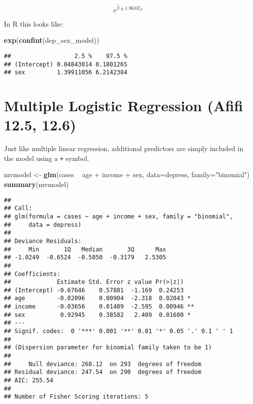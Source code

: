 \documentclass[]{article}
\newenvironment{Shaded}{\begin{snugshade}}{\end{snugshade}}
\newcommand{\KeywordTok}[1]{\textcolor[rgb]{0.13,0.29,0.53}{\textbf{{#1}}}}
\newcommand{\DataTypeTok}[1]{\textcolor[rgb]{0.13,0.29,0.53}{{#1}}}
\newcommand{\StringTok}[1]{\textcolor[rgb]{0.31,0.60,0.02}{{#1}}}
\newcommand{\NormalTok}[1]{{#1}}
\begin{document}
\[e^{\hat{\beta} \pm 1.96 SE_{\beta}} \]

In R this looks like:

\begin{Shaded}
\begin{Highlighting}[]
\KeywordTok{exp}\NormalTok{(}\KeywordTok{confint}\NormalTok{(dep_sex_model))}
\end{Highlighting}
\end{Shaded}

\begin{verbatim}
##                  2.5 %    97.5 %
## (Intercept) 0.04843014 0.1801265
## sex         1.39911056 6.2142384
\end{verbatim}

\section{Multiple Logistic Regression (Afifi 12.5,
12.6)}\label{multiple-logistic-regression-afifi-12.5-12.6}

Just like multiple linear regression, additional predictors are simply
included in the model using a \texttt{+} symbol.

\begin{Shaded}
\begin{Highlighting}[]
\NormalTok{mvmodel <-}\StringTok{ }\KeywordTok{glm}\NormalTok{(cases ~}\StringTok{ }\NormalTok{age +}\StringTok{ }\NormalTok{income +}\StringTok{ }\NormalTok{sex, }\DataTypeTok{data=}\NormalTok{depress, }\DataTypeTok{family=}\StringTok{"binomial"}\NormalTok{)}
\KeywordTok{summary}\NormalTok{(mvmodel)}
\end{Highlighting}
\end{Shaded}

\begin{verbatim}
## 
## Call:
## glm(formula = cases ~ age + income + sex, family = "binomial", 
##     data = depress)
## 
## Deviance Residuals: 
##     Min       1Q   Median       3Q      Max  
## -1.0249  -0.6524  -0.5050  -0.3179   2.5305  
## 
## Coefficients:
##             Estimate Std. Error z value Pr(>|z|)   
## (Intercept) -0.67646    0.57881  -1.169  0.24253   
## age         -0.02096    0.00904  -2.318  0.02043 * 
## income      -0.03656    0.01409  -2.595  0.00946 **
## sex          0.92945    0.38582   2.409  0.01600 * 
## ---
## Signif. codes:  0 '***' 0.001 '**' 0.01 '*' 0.05 '.' 0.1 ' ' 1
## 
## (Dispersion parameter for binomial family taken to be 1)
## 
##     Null deviance: 268.12  on 293  degrees of freedom
## Residual deviance: 247.54  on 290  degrees of freedom
## AIC: 255.54
## 
## Number of Fisher Scoring iterations: 5
\end{verbatim}
\end{document}
